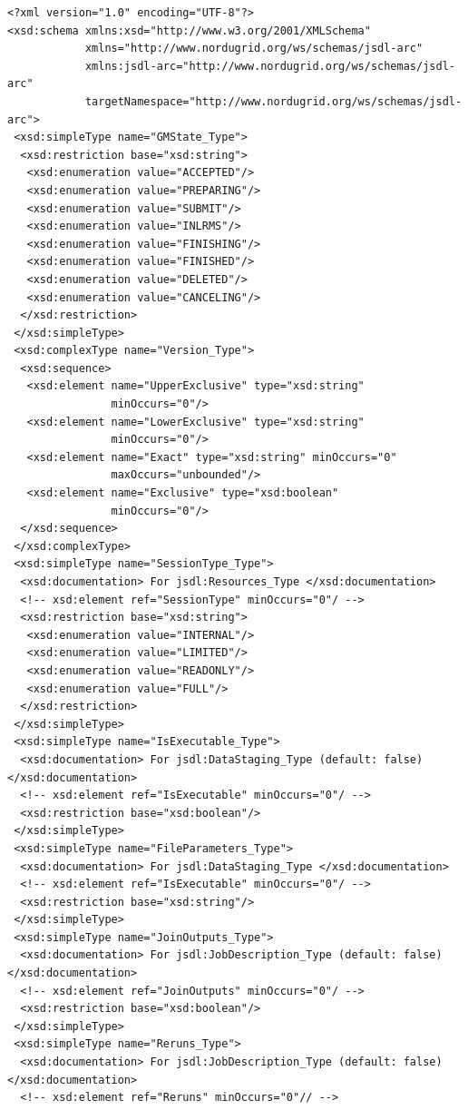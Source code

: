 \documentclass{article}                            %
\begin{document}
\begin{footnotesize}\begin{verbatim}
<?xml version="1.0" encoding="UTF-8"?>
<xsd:schema xmlns:xsd="http://www.w3.org/2001/XMLSchema"
            xmlns="http://www.nordugrid.org/ws/schemas/jsdl-arc"
            xmlns:jsdl-arc="http://www.nordugrid.org/ws/schemas/jsdl-arc"
            targetNamespace="http://www.nordugrid.org/ws/schemas/jsdl-arc">
 <xsd:simpleType name="GMState_Type">
  <xsd:restriction base="xsd:string">
   <xsd:enumeration value="ACCEPTED"/>
   <xsd:enumeration value="PREPARING"/>
   <xsd:enumeration value="SUBMIT"/>
   <xsd:enumeration value="INLRMS"/>
   <xsd:enumeration value="FINISHING"/>
   <xsd:enumeration value="FINISHED"/>
   <xsd:enumeration value="DELETED"/>
   <xsd:enumeration value="CANCELING"/>
  </xsd:restriction>
 </xsd:simpleType>
 <xsd:complexType name="Version_Type">
  <xsd:sequence>
   <xsd:element name="UpperExclusive" type="xsd:string"
                minOccurs="0"/>
   <xsd:element name="LowerExclusive" type="xsd:string"
                minOccurs="0"/>
   <xsd:element name="Exact" type="xsd:string" minOccurs="0"
                maxOccurs="unbounded"/>
   <xsd:element name="Exclusive" type="xsd:boolean"
                minOccurs="0"/>
  </xsd:sequence>
 </xsd:complexType>
 <xsd:simpleType name="SessionType_Type">
  <xsd:documentation> For jsdl:Resources_Type </xsd:documentation>
  <!-- xsd:element ref="SessionType" minOccurs="0"/ -->
  <xsd:restriction base="xsd:string">
   <xsd:enumeration value="INTERNAL"/>
   <xsd:enumeration value="LIMITED"/>
   <xsd:enumeration value="READONLY"/>
   <xsd:enumeration value="FULL"/>
  </xsd:restriction>
 </xsd:simpleType>
 <xsd:simpleType name="IsExecutable_Type">
  <xsd:documentation> For jsdl:DataStaging_Type (default: false) </xsd:documentation>
  <!-- xsd:element ref="IsExecutable" minOccurs="0"/ -->
  <xsd:restriction base="xsd:boolean"/>
 </xsd:simpleType>
 <xsd:simpleType name="FileParameters_Type">
  <xsd:documentation> For jsdl:DataStaging_Type </xsd:documentation>
  <!-- xsd:element ref="IsExecutable" minOccurs="0"/ -->
  <xsd:restriction base="xsd:string"/>
 </xsd:simpleType>
 <xsd:simpleType name="JoinOutputs_Type">
  <xsd:documentation> For jsdl:JobDescription_Type (default: false) </xsd:documentation>
  <!-- xsd:element ref="JoinOutputs" minOccurs="0"/ -->
  <xsd:restriction base="xsd:boolean"/>
 </xsd:simpleType>
 <xsd:simpleType name="Reruns_Type">
  <xsd:documentation> For jsdl:JobDescription_Type (default: false) </xsd:documentation>
  <!-- xsd:element ref="Reruns" minOccurs="0"// -->

\end{verbatim}
\end{footnotesize}
\end{document}
